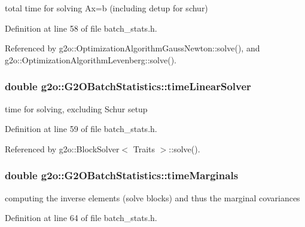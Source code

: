 total time for solving Ax=b (including detup for schur) 



Definition at line 58 of file batch\+\_\+stats.\+h.



Referenced by g2o\+::\+Optimization\+Algorithm\+Gauss\+Newton\+::solve(), and g2o\+::\+Optimization\+Algorithm\+Levenberg\+::solve().

\subsubsection[{\texorpdfstring{time\+Linear\+Solver}{timeLinearSolver}}]{\setlength{\rightskip}{0pt plus 5cm}double g2o\+::\+G2\+O\+Batch\+Statistics\+::time\+Linear\+Solver}\hypertarget{structg2o_1_1G2OBatchStatistics_adb423c3dac9262b7f4a315bbb108464a}{}\label{structg2o_1_1G2OBatchStatistics_adb423c3dac9262b7f4a315bbb108464a}


time for solving, excluding Schur setup 



Definition at line 59 of file batch\+\_\+stats.\+h.



Referenced by g2o\+::\+Block\+Solver$<$ Traits $>$\+::solve().

\subsubsection[{\texorpdfstring{time\+Marginals}{timeMarginals}}]{\setlength{\rightskip}{0pt plus 5cm}double g2o\+::\+G2\+O\+Batch\+Statistics\+::time\+Marginals}\hypertarget{structg2o_1_1G2OBatchStatistics_a58e5d0960dc35e682424dce2b50e4fa9}{}\label{structg2o_1_1G2OBatchStatistics_a58e5d0960dc35e682424dce2b50e4fa9}


computing the inverse elements (solve blocks) and thus the marginal covariances 



Definition at line 64 of file batch\+\_\+stats.\+h.



